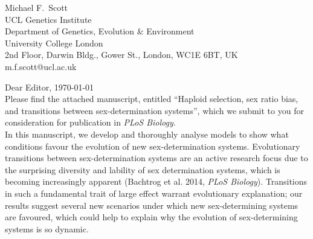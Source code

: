 \documentclass[12pt,letterpaper]{article}
\begin{document}
\thispagestyle{empty}

\noindent Michael F.\ Scott\\
UCL Genetics Institute\\
Department of Genetics, Evolution \& Environment\\
University College London \\
2nd Floor, Darwin Bldg., Gower St., London, WC1E 6BT, UK\\
 m.f.scott@ucl.ac.uk\\


\noindent Dear Editor, \hfill \today \\

Please find the attached manuscript, entitled ``Haploid selection, sex ratio bias, and transitions between sex-determination systems'', which we submit to you for consideration for publication in \textit{PLoS Biology}.
\\

In this manuscript, we develop and thoroughly analyse models to show what conditions favour the evolution of new sex-determination systems. Evolutionary transitions between sex-determination systems are an active research focus due to the surprising diversity and lability of sex determination systems, which is becoming increasingly apparent (Bachtrog et al. 2014, \textit{PLoS Biology}). Transitions in such a fundamental trait of large effect warrant evolutionary explanation; our results suggest several new scenarios under which new sex-determining systems are favoured, which could help to explain why the evolution of sex-determining systems is so dynamic.  \\
\end{document}
